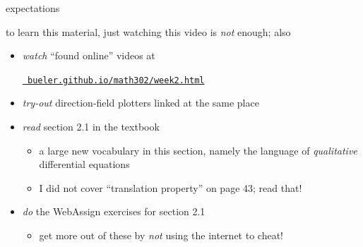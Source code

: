 \documentclass{beamer}
\begin{document}
\begin{frame}{expectations}

to learn this material, just watching this video is \emph{not} enough; also
\begin{itemize}
\item \emph{watch} ``found online'' videos at

\centerline{\href{https://bueler.github.io/math302/week2.html}{\tt \color{cyan} bueler.github.io/math302/week2.html}}
\item \emph{try-out} direction-field plotters linked at the same place
\item \emph{read} section 2.1 in the textbook
    \begin{itemize}
    \item a large new vocabulary in this section, namely the language of \emph{qualitative} differential equations
    \item I did not cover ``translation property'' on page 43; read that!
    \end{itemize}
\item \emph{do} the WebAssign exercises for section 2.1
    \begin{itemize}
    \item get more out of these by \emph{not} using the internet to cheat!
    \end{itemize}
\end{itemize}
\end{frame}
\end{document}
